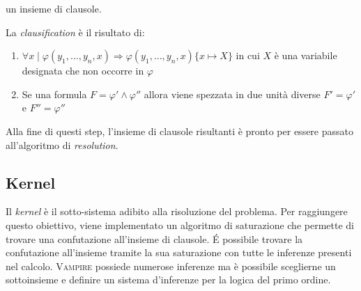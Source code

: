 \begin{description}
    un insieme di clausole.
    \begin{definition}
        La \emph{clausification} è il risultato di:
        \begin{enumerate}
            \item $\forall x\mid\varphi(y_1,\dots,y_n,x)\Rightarrow\varphi(y_1,\dots,y_n,x)\{x \mapsto X\}$  in cui $X$ è una variabile designata che non occorre in $\varphi$
            \item Se una formula $F=\varphi'\land\varphi''$ allora viene spezzata in due unità diverse 
            $F'=\varphi'$ e $F''=\varphi''$
        \end{enumerate}
    \end{definition}  
\end{description} 
Alla fine di questi step, l'insieme di clausole risultanti è pronto per essere passato all'algoritmo di \emph{resolution}.
\subsection{Kernel}\label{sec-kernel}
Il \emph{kernel} è il sotto-sistema adibito alla risoluzione del problema. Per raggiungere questo obiettivo, 
viene implementato un algoritmo di saturazione che permette di trovare una confutazione all'insieme di clausole.
\'E possibile trovare la confutazione all'insieme tramite la sua saturazione con tutte le inferenze presenti nel calcolo. 
\textsc{Vampire} possiede numerose inferenze ma è possibile sceglierne un sottoinsieme e definire un sistema 
d'inferenze per la logica del primo ordine.

